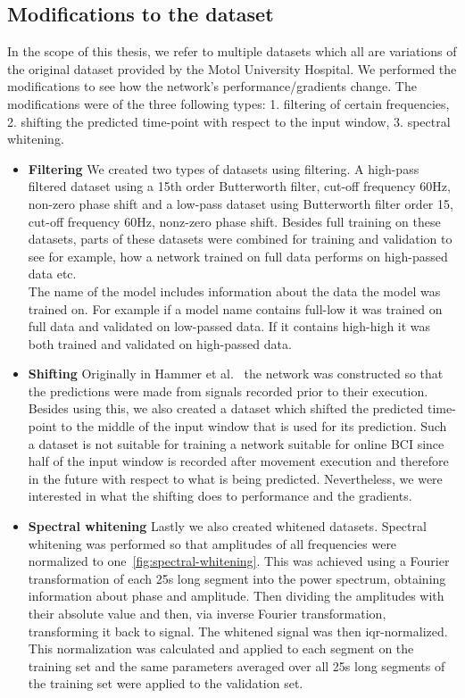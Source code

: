\subsection{Modifications to the dataset}\label{subsec:modifications-to-the-dataset}
In the scope of this thesis, we refer to multiple datasets which all are variations of the original dataset provided by the Motol University Hospital.
We performed the modifications to see how the network's performance/gradients change.
The modifications were of the three following types: 1. filtering of certain frequencies, 2. shifting the predicted time-point with respect to the input window, 3. spectral whitening.
\begin{itemize}
\item \textbf{Filtering} We created two types of datasets using filtering.
A high-pass filtered dataset using a 15th order Butterworth filter, cut-off frequency 60Hz, non-zero phase shift and a low-pass dataset using Butterworth filter order 15, cut-off frequency 60Hz, nonz-zero phase shift.
Besides full training on these datasets, parts of these datasets were combined for training and validation to see for example, how a network trained on full data performs on high-passed data etc.\\
The name of the model includes information about the data the model was trained on.
For example if a model name contains full-low it was trained on full data and validated on low-passed data.
If it contains high-high it was both trained and validated on high-passed data.

\item \textbf{Shifting} Originally in Hammer et al.~\cite{Hammer-2021} the network was constructed so that the predictions were made from signals recorded prior to their execution.
Besides using this, we also created a dataset which shifted the predicted time-point to the middle of the input window that is used for its prediction.
Such a dataset is not suitable for training a network suitable for online BCI since half of the input window is recorded after movement execution and therefore in the future with respect to what is being predicted.
Nevertheless, we were interested in what the shifting does to performance and the gradients.


\item \textbf{Spectral whitening} Lastly we also created whitened datasets.
Spectral whitening was performed so that amplitudes of all frequencies were normalized to one~\ref{fig:spectral-whitening}.
This was achieved using a Fourier transformation of each 25s long segment into the power spectrum, obtaining information about phase and amplitude.
Then dividing the amplitudes with their absolute value and then, via inverse Fourier transformation, transforming it back to signal.
The whitened signal was then iqr-normalized.
This normalization was calculated and applied to each segment on the training set and the same parameters averaged over all 25s long segments of the training set were applied to the validation set.


\end{itemize}
